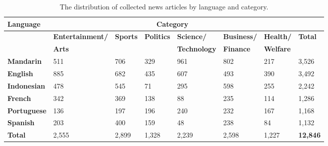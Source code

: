 \documentclass{l4proj}
\begin{document}
\begin{table}[]
\begin{tabular}{llllllll}
\hline
\textbf{Language}   & \multicolumn{6}{c}{\textbf{Category}}                                                                                       &                 \\ \hline
\textbf{}           & \textbf{Entertainment/} & \textbf{Sports} & \textbf{Politics} & \textbf{Science/}     & \textbf{Business/} & \textbf{Health/}   & \textbf{Total}  \\
\textbf{}           & \textbf{Arts}         & \textbf{}       & \textbf{}         & \textbf{Technology} & \textbf{Finance} & \textbf{Welfare} & \textbf{}       \\ \hline
\textbf{Mandarin}   & 511                    & 706             & 329               & 961                  & 802               & 217               & 3,526           \\
\textbf{English}    & 885                    & 682             & 435               & 607                  & 493               & 390               & 3,492           \\
\textbf{Indonesian} & 478                    & 545             & 71                & 295                  & 598               & 255               & 2,242           \\
\textbf{French}     & 342                    & 369             & 138               & 88                   & 235               & 114               & 1,286           \\
\textbf{Portuguese} & 136                    & 197             & 196               & 240                  & 232               & 167               & 1,168           \\
\textbf{Spanish}    & 203                    & 400             & 159               & 48                   & 238               & 84                & 1,132           \\ \hline
\textbf{Total}      & 2,555                  & 2,899           & 1,328             & 2,239                & 2,598             & 1,227             & \textbf{12,846}
\\ \hline
\end{tabular}
\caption{The distribution of collected news articles by language and category.}
\label{table:collectedstats}
\end{table}
\end{document}
